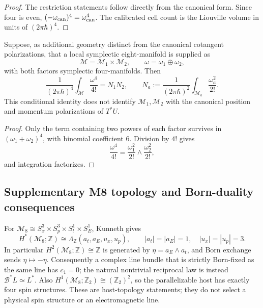 \documentclass[11pt,a4paper]{article}
\begin{document}
\begin{proof}
The restriction statements follow directly from the canonical form.  Since
four is even, \((-\omega_{\rm can})^4=\omega_{\rm can}^4\).  The calibrated
cell count is the Liouville volume in units of \((2\pi\hbar)^4\).
\end{proof}

\begin{lemma}
\label{paper3g:lemma:atlas-optional-product-symplectic-factorization-1074eae}

Suppose, as additional geometry distinct from the canonical cotangent
polarizations, that a local symplectic eight-manifold is supplied as
\[
 \mathcal M=\mathcal M_1\times\mathcal M_2,
 \qquad
 \omega=\omega_1\oplus\omega_2,
\]
with both factors symplectic four-manifolds.  Then
\[
 \frac{1}{(2\pi\hbar)^4}\int_{\mathcal M}\frac{\omega^4}{4!}
 =N_1N_2,
 \qquad
 N_a:=\frac{1}{(2\pi\hbar)^2}\int_{\mathcal M_a}\frac{\omega_a^2}{2!}.
\]
This conditional identity does not identify \(\mathcal M_1,\mathcal M_2\)
with the canonical position and momentum polarizations of \(T^*U\).
\end{lemma}

\begin{proof}
Only the term containing two powers of each factor survives in
\((\omega_1+\omega_2)^4\), with binomial coefficient \(6\).  Division by
\(4!\) gives
\[
 \frac{\omega^4}{4!}
 =\frac{\omega_1^2}{2!}\wedge\frac{\omega_2^2}{2!},
\]
and integration factorizes.
\end{proof}

\subsection{Supplementary M8 topology and Born-duality consequences}
\label{p3b:app:v181-m8-topology-duality}
For
$\mathcal M_8\cong S_x^3\times S_p^3\times S_t^1\times S_E^1$,
Kunneth gives
\[
 H^*(\mathcal M_8;\mathbb Z)
 \cong\Lambda_{\mathbb Z}(a_t,a_E,u_x,u_p),
 \qquad |a_t|=|a_E|=1,\quad |u_x|=|u_p|=3.
\]
In particular $H^2(\mathcal M_8;\mathbb Z)\cong\mathbb Z$ is generated by
$\eta=a_E\wedge a_t$, and Born exchange sends $\eta\mapsto-\eta$.
Consequently a complex line bundle that is strictly Born-fixed as the same
line has $c_1=0$; the natural nontrivial reciprocal law is instead
$\mathcal B^*L\simeq L^*$.  Also
$H^1(\mathcal M_8;\mathbb Z_2)\cong(\mathbb Z_2)^2$, so the parallelizable
host has exactly four spin structures.  These are host-topology statements;
they do not select a physical spin structure or an electromagnetic line.
\end{document}
